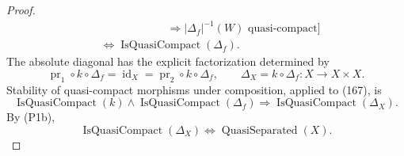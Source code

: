 \begin{proof}
\[\begin{aligned}
      &\hspace{6em}\Longrightarrow
        |\Delta_f|^{-1}(W)\text{ quasi-compact}\bigr]\\
      &\Longleftrightarrow\operatorname{IsQuasiCompact}(\Delta_f).
  \end{aligned}                                                     \tag{166b}
  \]
  The absolute diagonal has the explicit factorization determined by
  \[
    \operatorname{pr}_1\circ k\circ\Delta_f
      =\operatorname{id}_X
      =\operatorname{pr}_2\circ k\circ\Delta_f,
    \qquad
    \Delta_X=k\circ\Delta_f\colon X\longrightarrow X\times X.   \tag{167}
  \]
  Stability of quasi-compact morphisms under composition, applied to (167),
  is
  \[
    \operatorname{IsQuasiCompact}(k)
      \wedge\operatorname{IsQuasiCompact}(\Delta_f)
      \Longrightarrow\operatorname{IsQuasiCompact}(\Delta_X).
  \]
  By (P1b),
  \[
    \operatorname{IsQuasiCompact}(\Delta_X)
      \Longleftrightarrow\operatorname{QuasiSeparated}(X).
  \]
\end{proof}

